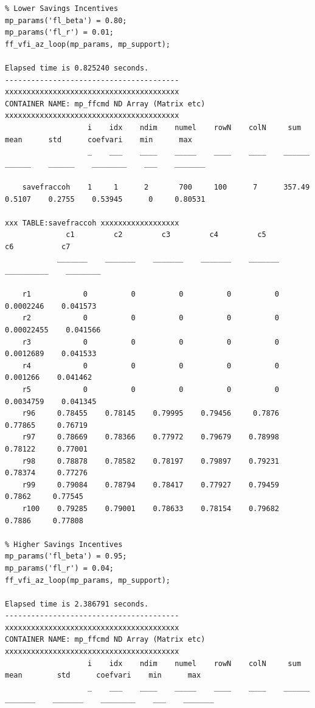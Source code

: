 \documentclass[
]{book}
\begin{document}
\begin{verbatim}
% Lower Savings Incentives
mp_params('fl_beta') = 0.80;
mp_params('fl_r') = 0.01;
ff_vfi_az_loop(mp_params, mp_support);

Elapsed time is 0.825240 seconds.
----------------------------------------
xxxxxxxxxxxxxxxxxxxxxxxxxxxxxxxxxxxxxxxx
CONTAINER NAME: mp_ffcmd ND Array (Matrix etc)
xxxxxxxxxxxxxxxxxxxxxxxxxxxxxxxxxxxxxxxx
                   i    idx    ndim    numel    rowN    colN     sum       mean      std      coefvari    min      max  
                   _    ___    ____    _____    ____    ____    ______    ______    ______    ________    ___    _______

    savefraccoh    1     1      2       700     100      7      357.49    0.5107    0.2755    0.53945      0     0.80531

xxx TABLE:savefraccoh xxxxxxxxxxxxxxxxxx
              c1         c2         c3         c4         c5           c6           c7   
            _______    _______    _______    _______    _______    __________    ________

    r1            0          0          0          0          0     0.0002246    0.041573
    r2            0          0          0          0          0    0.00022455    0.041566
    r3            0          0          0          0          0     0.0012689    0.041533
    r4            0          0          0          0          0      0.001266    0.041462
    r5            0          0          0          0          0     0.0034759    0.041345
    r96     0.78455    0.78145    0.79995    0.79456     0.7876       0.77865     0.76719
    r97     0.78669    0.78366    0.77972    0.79679    0.78998       0.78122     0.77001
    r98     0.78878    0.78582    0.78197    0.79897    0.79231       0.78374     0.77276
    r99     0.79084    0.78794    0.78417    0.77927    0.79459        0.7862     0.77545
    r100    0.79285    0.79001    0.78633    0.78154    0.79682        0.7886     0.77808

% Higher Savings Incentives
mp_params('fl_beta') = 0.95;
mp_params('fl_r') = 0.04;
ff_vfi_az_loop(mp_params, mp_support);

Elapsed time is 2.386791 seconds.
----------------------------------------
xxxxxxxxxxxxxxxxxxxxxxxxxxxxxxxxxxxxxxxx
CONTAINER NAME: mp_ffcmd ND Array (Matrix etc)
xxxxxxxxxxxxxxxxxxxxxxxxxxxxxxxxxxxxxxxx
                   i    idx    ndim    numel    rowN    colN     sum       mean        std      coefvari    min      max  
                   _    ___    ____    _____    ____    ____    ______    _______    _______    ________    ___    _______


\end{verbatim}
\end{document}
